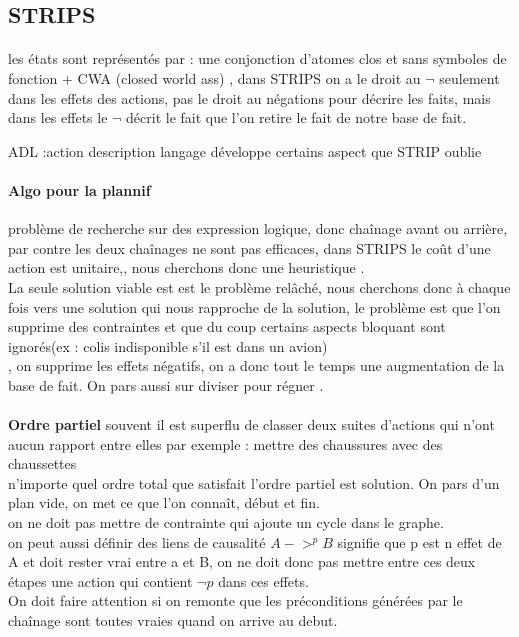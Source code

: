 \documentclass{article}
\begin{document}
\subsection{STRIPS} 
\paragraph{}
les états sont représentés par : une conjonction d'atomes clos et sans symboles de fonction + CWA (closed world ass) , dans STRIPS on a le droit au $\neg$ seulement dans les effets des actions, pas le droit au négations pour décrire les faits, mais dans les effets le $\neg$ décrit le fait que l'on retire le fait de notre base de fait.

ADL :action description langage développe certains aspect que STRIP oublie

\paragraph{Algo pour la plannif} problème de recherche sur des expression logique, donc chaînage avant ou arrière, 
\\
par contre les deux chaînages ne sont pas efficaces, dans STRIPS le coût d'une action est unitaire,, nous cherchons donc une heuristique .\\
La seule solution viable est est le problème relâché, nous cherchons donc à chaque fois vers une solution qui nous rapproche de la solution, le problème est que l'on supprime des contraintes et que du coup certains aspects bloquant sont ignorés(ex : colis indisponible s'il est dans un avion)\\, on supprime les effets négatifs, on a donc tout le temps une augmentation de la base de fait.
On pars aussi sur diviser pour régner .\\\\
\textbf{Ordre partiel} souvent il est superflu de classer deux suites d'actions qui n'ont aucun rapport entre elles
par exemple  : mettre des chaussures avec des chaussettes\\n'importe quel ordre total que satisfait l'ordre partiel est solution. On pars d'un plan vide, on met ce que l'on connaît, début et fin.\\
on ne doit pas mettre de contrainte qui ajoute un cycle dans le graphe. \\on peut aussi définir des liens de causalité $A ->^p B$  signifie que p est n effet de A et doit rester vrai entre a et B, on ne doit donc pas mettre entre ces deux étapes une action qui contient $\neg p$ dans ces effets.\\ On doit faire attention si on remonte que les préconditions générées par le chaînage sont toutes vraies quand on arrive au debut.
\end{document}

